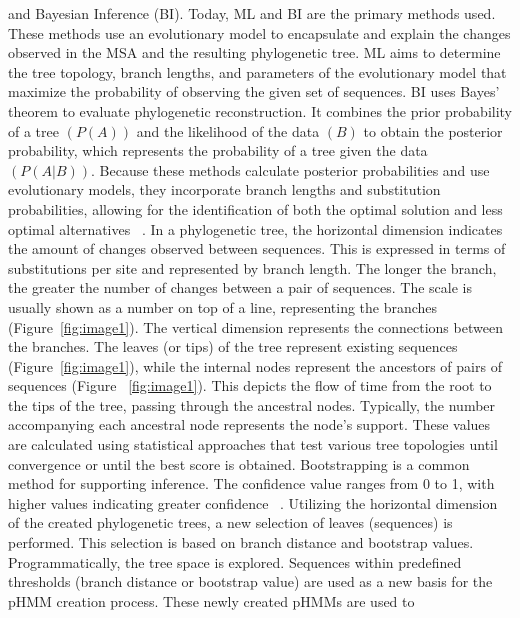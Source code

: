 \documentclass[unnumsec,webpdf,contemporary,large]{oup-authoring-template}%
\theoremstyle{thmstyleone}%
\theoremstyle{thmstyletwo}%
\theoremstyle{thmstylethree}%
\begin{document}
and Bayesian Inference (BI). Today, ML and BI are the primary methods used.
These methods use an evolutionary model to encapsulate and explain the changes
observed in the MSA and the resulting phylogenetic tree. ML aims to determine
the tree topology, branch lengths, and parameters of the evolutionary model that
maximize the probability of observing the given set of sequences. BI uses Bayes'
theorem to evaluate phylogenetic reconstruction. It combines the prior
probability of a tree $(P(A))$ and the likelihood of the data $(B)$ to obtain
the posterior probability, which represents the probability of a tree given the
data $(P(A|B))$. Because these methods calculate posterior probabilities and use
evolutionary models, they incorporate branch lengths and substitution
probabilities, allowing for the identification of both the optimal solution and
less optimal alternatives
~\cite{yang_molecular_2014,selberg_ancestral_2021,thornton_resurrecting_2004,scossa_ancestral_2021,ayuso-fernandez_ancestral_2022,nascimento_biologists_2017,huelsenbeck_bayesian_2001}.
In a phylogenetic tree, the horizontal dimension indicates the amount of changes
observed between sequences. This is expressed in terms of substitutions per site
and represented by branch length. The longer the branch, the greater the number
of changes between a pair of sequences. The scale is usually shown as a number
on top of a line, representing the branches (Figure~\ref{fig:image1}). The
vertical dimension represents the connections between the branches. The leaves
(or tips) of the tree represent existing sequences (Figure~\ref{fig:image1}),
while the internal nodes represent the ancestors of pairs of sequences (Figure
~\ref{fig:image1}). This depicts the flow of time from the root to the tips of
the tree, passing through the ancestral nodes. Typically, the number
accompanying each ancestral node represents the node's support. These values are
calculated using statistical approaches that test various tree topologies until
convergence or until the best score is obtained. Bootstrapping is a common
method for supporting inference. The confidence value ranges from 0 to 1, with
higher values indicating greater confidence
~\cite{yang_molecular_2014,anisimova_evolutionary_2019}. Utilizing the
horizontal dimension of the created phylogenetic trees, a new selection of
leaves (sequences) is performed. This selection is based on branch distance and
bootstrap values. Programmatically, the tree space is explored. Sequences within
predefined thresholds (branch distance or bootstrap value) are used as a new
basis for the pHMM creation process. These newly created pHMMs are used to
\end{document}
